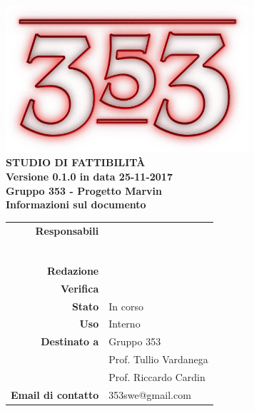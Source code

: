 \documentclass[openany, a4paper, 12pt]{report}
\begin{document}
\begin{titlepage}
	\centering
	\vfill
	{
		\bfseries
		\vskip2cm
		\includegraphics[width=9cm]{../../common/images/logo.png} \\
		\vfill
		\Huge{STUDIO DI FATTIBILITÀ}\\
		\vfill
		\Large Versione 0.1.0 in data 25-11-2017\\
		\large Gruppo 353 - Progetto Marvin\\
		\vfill
	\normalsize Informazioni sul documento\\
\begin{table}[htbp]
	\centering
	\renewcommand\arraystretch{1.2}
	\begin{tabular}{r|l}
		\hline
		\textbf{Responsabili}	& \Elena\\
								& \Valentina\\
								& \Mirco\\
								& \Riccardo\\
								& \Gianluca\\
								& \Parwinder\\
								& \Davide\\
		
		\textbf{Redazione} 	& \\
		\textbf{Verifica} 	& \\	
						
		\textbf{Stato} 			& In corso\\
		\textbf{Uso}			& Interno\\
		\textbf{Destinato a}   	& Gruppo 353\\
								& Prof. Tullio Vardanega\\
								& Prof. Riccardo Cardin\\
		
		\textbf{Email di contatto}	& 353swe@gmail.com
	\end{tabular}
\end{table}
		\vfill
	}    
\end{titlepage}

\tableofcontents
\newpage
{}






%


 
\end{document}

